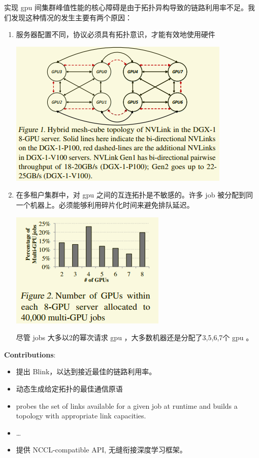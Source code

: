 \documentclass[11pt]{article}
\begin{document}
实现 gpu 间集群峰值性能的核心障碍是由于拓扑异构导致的链路利用率不足。我们发现这种情况的发生主要有两个原因：
\begin{enumerate}
\item 服务器配置不同，协议必须具有拓扑意识，才能有效地使用硬件
\begin{center}
\includegraphics[width=.9\linewidth]{Blink.org_imgs/20201111_092407_ah2YN2.png}
\end{center}
\item 在多租户集群中，对 gpu 之间的互连拓扑是不敏感的。许多 job 被分配到同一个机器上。必须能够利用碎片化时间来避免排队延迟。
\begin{center}
\includegraphics[width=.9\linewidth]{Blink.org_imgs/20201111_093715_mKtQTR.png}
\end{center}
尽管 jobs 大多以2的幂次请求 gpu ，大多数机器还是分配了3,5,6,7个 gpu 。
\end{enumerate}

\textbf{Contributions}:
\begin{itemize}
\item 提出 Blink，以达到接近最佳的链路利用率。
\item 动态生成给定拓扑的最佳通信原语
\item probes the set of links available for a given job at runtime and builds a topology with appropriate link capacities.
\item \ldots{}
\item 提供 NCCL-compatible API, 无缝衔接深度学习框架。
\end{itemize}
\end{document}
